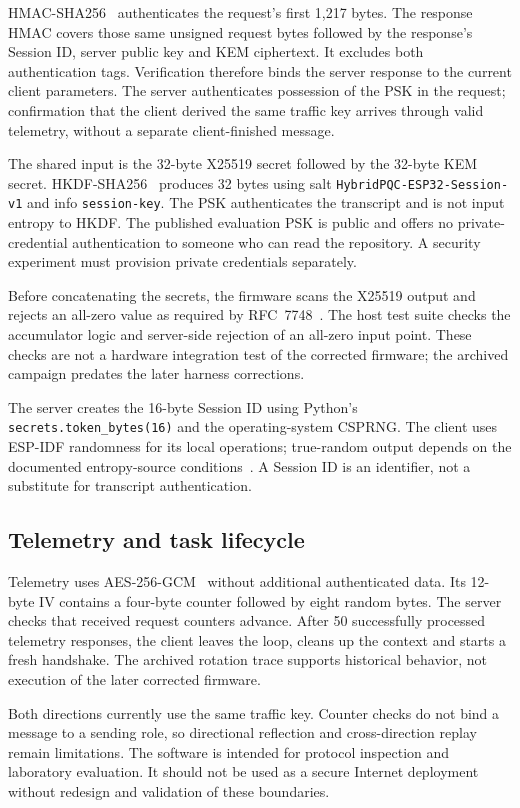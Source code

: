 \documentclass[pdflatex,sn-mathphys-num]{sn-jnl}
\begin{document}
HMAC-SHA256~\cite{b24} authenticates the request's first 1,217 bytes. The response HMAC covers those same unsigned request bytes followed by the response's Session ID, server public key and KEM ciphertext. It excludes both authentication tags. Verification therefore binds the server response to the current client parameters. The server authenticates possession of the PSK in the request; confirmation that the client derived the same traffic key arrives through valid telemetry, without a separate client-finished message.

The shared input is the 32-byte X25519 secret followed by the 32-byte KEM secret. HKDF-SHA256~\cite{b20,b33} produces 32 bytes using salt \texttt{HybridPQC-ESP32-Session-v1} and info \texttt{session-key}. The PSK authenticates the transcript and is not input entropy to HKDF. The published evaluation PSK is public and offers no private-credential authentication to someone who can read the repository. A security experiment must provision private credentials separately.

Before concatenating the secrets, the firmware scans the X25519 output and rejects an all-zero value as required by RFC~7748~\cite{b19}. The host test suite checks the accumulator logic and server-side rejection of an all-zero input point. These checks are not a hardware integration test of the corrected firmware; the archived campaign predates the later harness corrections.

The server creates the 16-byte Session ID using Python's \texttt{secrets.token\_bytes(16)} and the operating-system CSPRNG. The client uses ESP-IDF randomness for its local operations; true-random output depends on the documented entropy-source conditions~\cite{b43}. A Session ID is an identifier, not a substitute for transcript authentication.

\subsection{Telemetry and task lifecycle}
Telemetry uses AES-256-GCM~\cite{b22,b29,b30,b35} without additional authenticated data. Its 12-byte IV contains a four-byte counter followed by eight random bytes. The server checks that received request counters advance. After 50 successfully processed telemetry responses, the client leaves the loop, cleans up the context and starts a fresh handshake. The archived rotation trace supports historical behavior, not execution of the later corrected firmware.

Both directions currently use the same traffic key. Counter checks do not bind a message to a sending role, so directional reflection and cross-direction replay remain limitations. The software is intended for protocol inspection and laboratory evaluation. It should not be used as a secure Internet deployment without redesign and validation of these boundaries.
\end{document}
